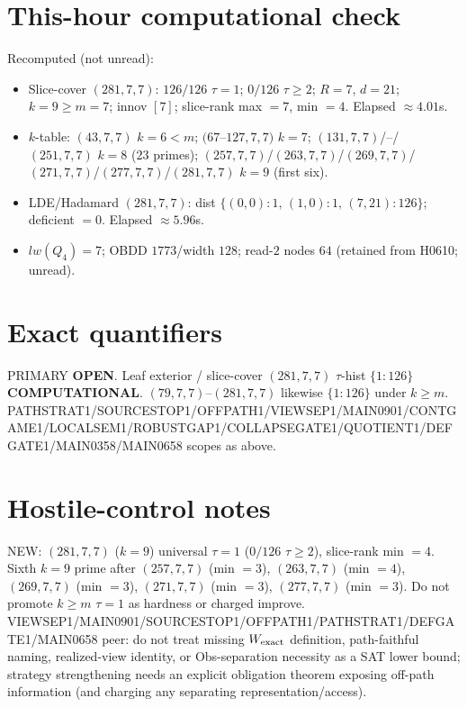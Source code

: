 \documentclass[11pt]{article}
\begin{document}
\section*{This-hour computational check}
Recomputed (not unread):
\begin{itemize}
\item Slice-cover $(281,7,7)$: $126/126$ $\tau{=}1$; $0/126$ $\tau{\ge}2$; $R{=}7$, $d{=}21$;
  $k{=}9{\ge}m{=}7$; innov $[7]$; slice-rank max $=7$, min $=4$. Elapsed $\approx4.01$s.
\item $k$-table: $(43,7,7)$ $k{=}6{<}m$; $(67$--$127,7,7)$ $k{=}7$;
  $(131,7,7)$/--/$(251,7,7)$ $k{=}8$ (23 primes); $(257,7,7)$/$(263,7,7)$/$(269,7,7)$/$(271,7,7)$/$(277,7,7)$/$(281,7,7)$ $k{=}9$ (first six).
\item LDE/Hadamard $(281,7,7)$: dist $\{(0,0){:}1,\,(1,0){:}1,\,(7,21){:}126\}$; deficient $=0$. Elapsed $\approx5.96$s.
\item $lw(Q_4)=7$; OBDD $1773$/width $128$; read-$2$ nodes $64$ (retained from H0610; unread).
\end{itemize}

\section*{Exact quantifiers}
PRIMARY \textbf{OPEN}. Leaf exterior / slice-cover $(281,7,7)$ $\tau$-hist $\{1{:}126\}$ \textbf{COMPUTATIONAL}.
$(79,7,7)$--$(281,7,7)$ likewise $\{1{:}126\}$ under $k{\ge}m$.
PATHSTRAT1/SOURCESTOP1/OFFPATH1/VIEWSEP1/MAIN0901/CONTGAME1/LOCALSEM1/ROBUSTGAP1/COLLAPSEGATE1/QUOTIENT1/DEFGATE1/MAIN0358/MAIN0658 scopes as above.

\section*{Hostile-control notes}
NEW: $(281,7,7)$ ($k{=}9$) universal $\tau{=}1$ ($0/126$ $\tau{\ge}2$), slice-rank min $=4$.
Sixth $k{=}9$ prime after $(257,7,7)$ (min $=3$), $(263,7,7)$ (min $=4$), $(269,7,7)$ (min $=3$), $(271,7,7)$ (min $=3$), $(277,7,7)$ (min $=3$).
Do not promote $k{\ge}m$ $\tau{=}1$ as hardness or charged improve.
VIEWSEP1/MAIN0901/SOURCESTOP1/OFFPATH1/PATHSTRAT1/DEFGATE1/MAIN0658 peer: do not treat missing $W_{\rm exact}$ definition,
path-faithful naming, realized-view identity, or Obs-separation necessity as a SAT lower bound;
strategy strengthening needs an explicit obligation theorem exposing off-path information
(and charging any separating representation/access).
\end{document}
